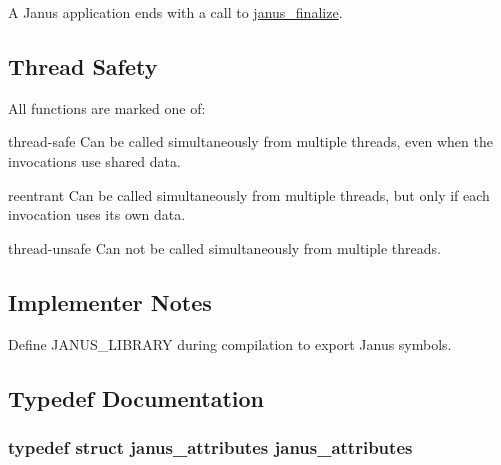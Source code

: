A Janus application ends with a call to \hyperlink{group__janus_gaca1ad3c66d178b28550980179f24f7d3}{janus\+\_\+finalize}.\hypertarget{group__janus_thread_safety}{}\subsection{Thread Safety}\label{group__janus_thread_safety}
All functions are marked one of\+:
\begin{DoxyItemize}
\item \label{group__janus_thread_safe}%
\hypertarget{group__janus_thread_safe}{}%
\begin{DoxyParagraph}{thread-\/safe}
Can be called simultaneously from multiple threads, even when the invocations use shared data.
\end{DoxyParagraph}

\item \label{group__janus_reentrant}%
\hypertarget{group__janus_reentrant}{}%
\begin{DoxyParagraph}{reentrant}
Can be called simultaneously from multiple threads, but only if each invocation uses its own data.
\end{DoxyParagraph}

\item \label{group__janus_thread_unsafe}%
\hypertarget{group__janus_thread_unsafe}{}%
\begin{DoxyParagraph}{thread-\/unsafe}
Can not be called simultaneously from multiple threads.
\end{DoxyParagraph}

\end{DoxyItemize}\hypertarget{group__janus_implementer_notes}{}\subsection{Implementer Notes}\label{group__janus_implementer_notes}
Define {\ttfamily J\+A\+N\+U\+S\+\_\+\+L\+I\+B\+R\+A\+R\+Y} during compilation to export Janus symbols. 

\subsection{Typedef Documentation}
\hypertarget{group__janus_ga347f0a77da5b4654281af39cefc7aad3}{}
\subsubsection[{janus\+\_\+attributes}]{\setlength{\rightskip}{0pt plus 5cm}typedef struct {\bf janus\+\_\+attributes}  {\bf janus\+\_\+attributes}}\label{group__janus_ga347f0a77da5b4654281af39cefc7aad3}


